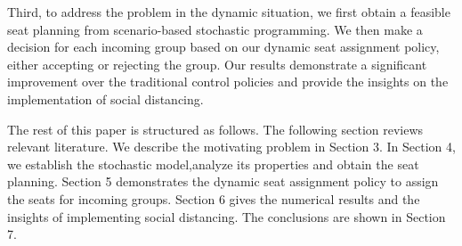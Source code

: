 Third, to address the problem in the dynamic situation, we first obtain a feasible seat planning from scenario-based stochastic programming. We then make a decision for each incoming group based on our dynamic seat assignment policy, either accepting or rejecting the group. Our results demonstrate a significant improvement over the traditional control policies and provide the insights on the implementation of social distancing.



The rest of this paper is structured as follows. The following section reviews relevant literature. We describe the motivating problem in Section 3. In Section 4, we establish the stochastic model,analyze its properties and obtain the seat planning. Section 5 demonstrates the dynamic seat assignment policy to assign the seats for incoming groups. Section 6 gives the numerical results and the insights of implementing social distancing. The conclusions are shown in Section 7.
\newpage
